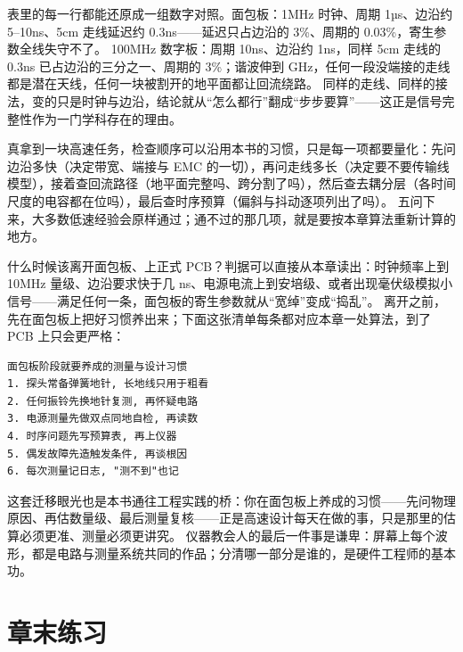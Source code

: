 表里的每一行都能还原成一组数字对照。面包板：1MHz 时钟、周期 1µs、边沿约 5--10ns、5cm 走线延迟约 0.3ns——延迟只占边沿的 3\%、周期的 0.03\%，寄生参数全线失守不了。
100MHz 数字板：周期 10ns、边沿约 1ns，同样 5cm 走线的 0.3ns 已占边沿的三分之一、周期的 3\%；谐波伸到 GHz，任何一段没端接的走线都是潜在天线，任何一块被割开的地平面都让回流绕路。
同样的走线、同样的接法，变的只是时钟与边沿，结论就从“怎么都行”翻成“步步要算”——这正是信号完整性作为一门学科存在的理由。

真拿到一块高速任务，检查顺序可以沿用本书的习惯，只是每一项都要量化：先问边沿多快（决定带宽、端接与 EMC 的一切），再问走线多长（决定要不要传输线模型），接着查回流路径（地平面完整吗、跨分割了吗），然后查去耦分层（各时间尺度的电容都在位吗），最后查时序预算（偏斜与抖动逐项列出了吗）。
五问下来，大多数低速经验会原样通过；通不过的那几项，就是要按本章算法重新计算的地方。

什么时候该离开面包板、上正式 PCB？判据可以直接从本章读出：时钟频率上到 10MHz 量级、边沿要求快于几 ns、电源电流上到安培级、或者出现毫伏级模拟小信号——满足任何一条，面包板的寄生参数就从“宽绰”变成“捣乱”。
离开之前，先在面包板上把好习惯养出来；下面这张清单每条都对应本章一处算法，到了 PCB 上只会更严格：

\begin{lstlisting}
面包板阶段就要养成的测量与设计习惯
1. 探头常备弹簧地针, 长地线只用于粗看
2. 任何振铃先换地针复测, 再怀疑电路
3. 电源测量先做双点同地自检, 再读数
4. 时序问题先写预算表, 再上仪器
5. 偶发故障先造触发条件, 再谈根因
6. 每次测量记日志, "测不到"也记
\end{lstlisting}

这套迁移眼光也是本书通往工程实践的桥：你在面包板上养成的习惯——先问物理原因、再估数量级、最后测量复核——正是高速设计每天在做的事，只是那里的估算必须更准、测量必须更讲究。
仪器教会人的最后一件事是谦卑：屏幕上每个波形，都是电路与测量系统共同的作品；分清哪一部分是谁的，是硬件工程师的基本功。

\section*{章末练习}

